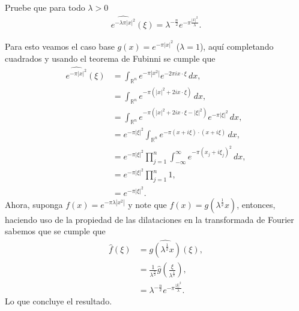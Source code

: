\begin{homeworkProblem}
  Pruebe que para todo $\lambda>0$
  \begin{align*}
    \hat{e^{-\lambda\pi|x|^2}}(\xi)=\lambda^{-\frac{n}{2}}e^{-\pi\frac{|x|^2}{\lambda}}.
  \end{align*}
  \begin{solution}
    Para esto veamos el caso base $g(x)=e^{-\pi|x|^2}$ ($\lambda=1$), aquí completando cuadrados y usando el teorema de Fubinni se cumple que
    \begin{align*}
      \hat{e^{-\pi|x|^2}}(\xi)&=\int_{\mathbb{R}^{n}}e^{-\pi|x^2|}e^{-2\pi ix\cdot\xi}\, dx,\\
      &=\int_{\mathbb{R}^{n}}e^{-\pi(|x|^2+2ix\cdot\xi)}\, dx,\\
      &=\int_{\mathbb{R}^{n}}e^{-\pi(|x|^2+2ix\cdot\xi-|\xi|^2)}e^{-\pi|\xi|^2}\, dx,\\
      &=e^{-\pi|\xi|^2}\int_{\mathbb{R}^{n}}e^{-\pi(x+i\xi)\cdot(x+i\xi)}\, dx,\\
      &=e^{-\pi|\xi|^2}\prod_{j=1}^{n}\int_{-\infty}^{\infty}e^{-\pi(x_j+i\xi_j)^{2}}\, dx,\\
      &=e^{-\pi|\xi|^2}\prod_{j=1}^{n}1,\\
      &=e^{-\pi|\xi|^2}.
    \end{align*}
    Ahora, suponga $f(x)=e^{-\pi\lambda|x^2|}$ y note que $f(x)=g\left(\lambda^{\frac{1}{2}}x\right)$, entonces, haciendo uso de la propiedad de las dilataciones en la transformada de Fourier sabemos que se cumple que
    \begin{align*}
      \hat{f}(\xi)&=\hat{g\left( \lambda^{\frac{1}{2}}x \right)}(\xi),\\
      &=\frac{1}{\lambda^{\frac{n}{2}}}\hat{g}\left( \frac{\xi}{\lambda^{\frac{1}{2}}} \right),\\
      &=\lambda^{-\frac{n}{2}}e^{-\pi\frac{|\xi|^2}{\lambda}}.
    \end{align*}
    Lo que concluye el resultado.
  \end{solution}
\end{homeworkProblem}
